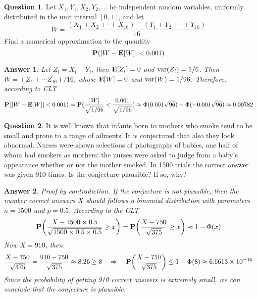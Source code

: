 \documentclass[utf8]{article}
\theoremstyle{definition}%
\newtheorem{question}{Question} %
\theoremstyle{plain}%
\newtheorem{answer}{Answer} %
\begin{document}
\begin{question}
    Let $X_1, Y_1, X_2, Y_2, \ldots$ be independent random variables, uniformly distributed in the unit interval $[0, 1]$, and let
    \begin{equation}
        W = \frac{(X_1 + X_2 + \cdot + X_{16}) - (Y_1 + Y_2 + \cdot + Y_{16})}{16}
    \end{equation}
    Find a numerical approximation to the quantity
    \begin{equation}
        \mathbf{P}(\abs{W - \mathbf{E}[W]} < 0.001)
    \end{equation}
\end{question}
\begin{answer}
    Let $Z_i = X_i - Y_i$, then $\mathbf{E}[Z_i] = 0$ and $\mathrm{var}(Z_i) = 1/6$. Then $W = (Z_1 + \cdots Z_{16}) / 16$, whose $\mathbf{E}[W] = 0$ and $\mathrm{var}(W) = 1/96$. Therefore, according to CLT
    \begin{equation}
        \mathbf{P}(\abs{W - \mathbf{E}[W]} < 0.001) = \mathbf{P}(\frac{\abs{W}}{\sqrt{1/96}} < \frac{0.001}{\sqrt{1/96}}) \approx \Phi(0.001\sqrt{96}) - \Phi(-0.001\sqrt{96}) \approx 0.00782
    \end{equation}
\end{answer}

\begin{question}
    It is well known that infants born to mothers who smoke tend to be small and prone to a range of ailments. It is conjectured that also they look abnormal. Nurses were shown selections of photographs of babies, one half of whom had smokers as mothers; the nurses were asked to judge from a baby's appearance whether or not the mother smoked. In 1500 trials the correct answer was given 910 times. Is the conjecture plausible? If so, why?
\end{question}
\begin{answer}
    Proof by contradiction. If the conjecture is not plausible, then the number correct answers $X$ should follows a binomial distribution with parameters $n = 1500$ and $p = 0.5$. According to the CLT
    \begin{equation}
        \mathbf{P}\qty(\frac{X - 1500 \times 0.5}{\sqrt{1500 \times 0.5 \times 0.5}} \geq x) = \mathbf{P}\qty(\frac{X - 750}{\sqrt{375}} \geq x) \approx 1 - \Phi(x)
    \end{equation}
    Now $X = 910$, then
    \begin{equation}
        \frac{X - 750}{\sqrt{375}} = \frac{910 - 750}{\sqrt{375}} \approx 8.26 \geq 8 \quad\Rightarrow\quad \mathbf{P}\qty(\frac{X - 750}{\sqrt{375}}) \leq 1 - \Phi(8) \approx 6.6613 \times 10^{-16}
    \end{equation}
    Since the probability of getting 910 correct answers is extremely small, we can conclude that the conjecture is plausible.
\end{answer}
\end{document}
